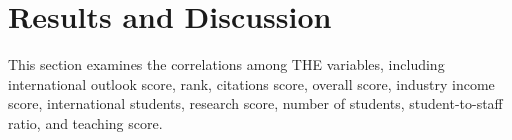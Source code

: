 \documentclass[conference]{IEEEtran}
\begin{document}
\section{Results and Discussion}
This section examines the correlations among THE variables, including international outlook score, rank, citations score, overall score, industry income score, international students, research score, number of students, student-to-staff ratio, and teaching score. 

%
\end{document}
